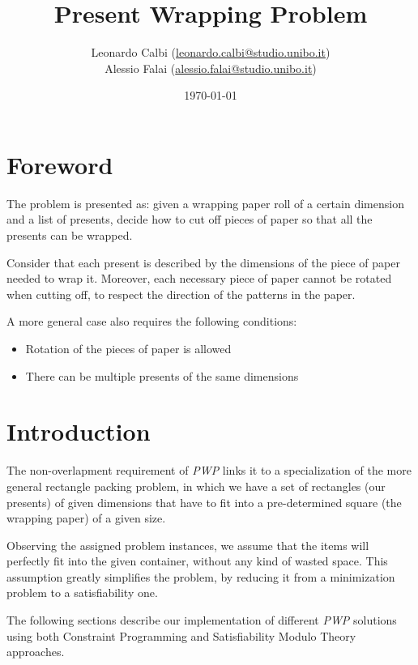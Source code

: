 \documentclass[a4paper,10pt]{article}
\begin{document}
\title{Present Wrapping Problem}
\author{Leonardo Calbi (\href{mailto:leonardo.calbi@studio.unibo.it}{leonardo.calbi@studio.unibo.it}) \\ Alessio Falai (\href{mailto:alessio.falai@studio.unibo.it}{alessio.falai@studio.unibo.it})}
\date{\today}
\maketitle
\tableofcontents
\newpage
\listoffigures
\newpage

\section*{Foreword}
The problem is presented as: given a wrapping paper roll of a certain dimension and a list of presents, decide how to cut off pieces of paper so  that all the presents can be wrapped.

Consider that each present is described by the dimensions of the piece of paper needed to wrap it. Moreover, each necessary piece of paper cannot be rotated when cutting off, to respect the direction of the patterns in the paper.

A more general case also requires the following conditions:
\begin{itemize}
   \item Rotation of the pieces of paper is allowed
   \item There can be multiple presents of the same dimensions
\end{itemize}

\section{Introduction}
The non-overlapment requirement of \emph{PWP} links it to a specialization of the more general rectangle packing problem, in which we have a set of rectangles (our presents) of given dimensions that have to fit into a pre-determined square (the wrapping paper) of a given size.

Observing the assigned problem instances, we assume that the items will perfectly fit into the given container, without any kind of wasted space. This assumption greatly simplifies the problem, by reducing it from a minimization problem to a satisfiability one.

The following sections describe our implementation of different \emph{PWP} solutions using both Constraint Programming and Satisfiability Modulo Theory approaches.
\end{document}
